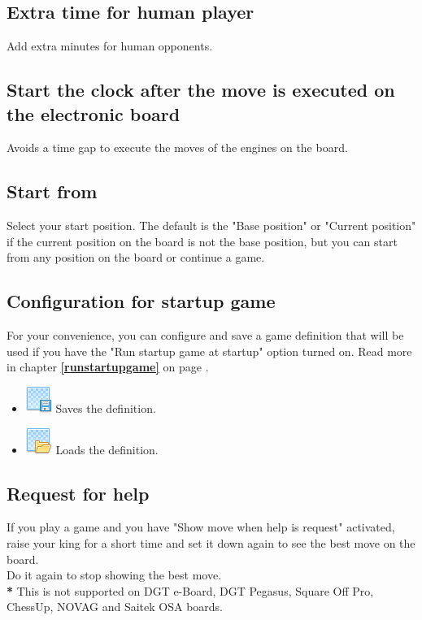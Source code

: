 \documentclass[11pt,a4paper]{article}
\begin{document}
\subsection{Extra time for human player}
Add extra minutes for human opponents.

\subsection{Start the clock after the move is executed on the electronic board}
Avoids a time gap to execute the moves of the engines on the board.


\subsection{Start from}
Select your start position. The default is the "Base position" or "Current position" if the current position on the board is not the base position, but you can start from any position on the board or continue a game.



\subsection{Configuration for startup game} \label{startupgame}

For your convenience, you can configure and save a game definition that will be used if you have the "Run startup game at startup" option turned on.  Read more in chapter \textbf{\ref{runstartupgame}  } on page \pageref{runstartupgame}.

\begin{itemize}
	  \item \includegraphics[scale=0.5]{layer_save.png} Saves the definition.
  	  \item \includegraphics[scale=0.5]{layer_open.png} Loads the definition.
\end{itemize}


\subsection{Request for help}
If you play a game and you have "Show move when help is request" activated, raise your king for a short time and set it down again to see the best move on the board.\\
Do it again to stop showing the best move.\\
{\color{red}\textbf{*}} This is not supported on DGT e-Board, DGT Pegasus, Square Off Pro, ChessUp, NOVAG and Saitek OSA boards.
\end{document}
